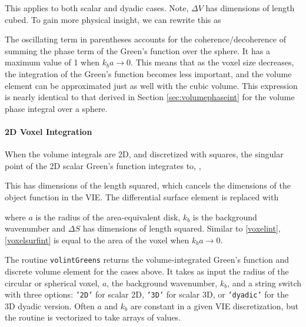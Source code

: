 This applies to both scalar and dyadic cases. Note, $\Delta V$ has dimensions of length cubed. To gain more physical insight, we can rewrite this as

The oscillating term in parentheses accounts for the coherence/decoherence of summing the phase term of the Green's function over the sphere. It has a maximum value of 1 when $k_b a \rightarrow 0$. This means that as the voxel size decreases, the integration of the Green's function becomes less important, and the volume element can be approximated just as well with the cubic volume. This expression is nearly identical to that derived in Section \ref{sec:volumephaseint} for the volume phase integral over a sphere.



\paragraph{2D Voxel Integration}
When the volume integrals are 2D, and discretized with squares, the singular point of the 2D scalar Green's function integrates to, \cite{gao2005analytical},

This has dimensions of the length squared, which cancels the dimensions of the object function in the VIE. The differential surface element is replaced with

\noindent where $a$ is the radius of the area-equivalent disk, $k_b$ is the background wavenumber and $\Delta S$ has dimensions of length squared. Similar to \eqref{voxelint}, \eqref{voxelsurfint} is equal to the area of the voxel when $k_b a \rightarrow 0$.

The routine \texttt{volintGreens} returns the volume-integrated Green's function and discrete volume element for the cases above. It takes as input the radius of the circular or spherical voxel, $a$, the background wavenumber, $k_b$, and a string switch with three options: \texttt{'2D'} for scalar 2D, \texttt{'3D'} for scalar 3D, or \texttt{'dyadic'} for the 3D dyadic version. Often $a$ and $k_b$ are constant in a given VIE discretization, but the routine is vectorized to take arrays of values.

